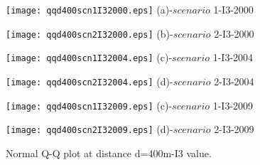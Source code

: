 \begin{figure}
     \begin{minipage}[h]{0.5\linewidth}
        \centering
        \texttt{[image: qqd400scn1I32000.eps]}
				\footnotesize{(a)-$scenario$ 1-I3-2000}
     \end{minipage}
\vspace{5.00mm}
    \begin{minipage}[h]{0.5\linewidth}
       \centering
       \texttt{[image: qqd400scn2I32000.eps]}
			\footnotesize{(b)-$scenario$ 2-I3-2000}
     \end{minipage}
\vspace{5.00mm}
    \begin{minipage}[h]{0.5\linewidth}
       \centering
       \texttt{[image: qqd400scn1I32004.eps]}
			\footnotesize{(c)-$scenario$ 1-I3-2004}
     \end{minipage}
\vspace{3.00mm}
    \begin{minipage}[h]{0.5\linewidth}
       \centering
       \texttt{[image: qqd400scn2I32004.eps]}
			\footnotesize{(d)-$scenario$ 2-I3-2004}
     \end{minipage}
	\vspace{3.00mm}
    \begin{minipage}[h]{0.5\linewidth}
       \centering
       \texttt{[image: qqd400scn1I32009.eps]}
			\footnotesize{(c)-$scenario$ 1-I3-2009}
     \end{minipage}
\vspace{3.00mm}
    \begin{minipage}[h]{0.5\linewidth}
       \centering
       \texttt{[image: qqd400scn2I32009.eps]}
			\footnotesize{(d)-$scenario$ 2-I3-2009}
     \end{minipage}
		\caption{Normal Q-Q plot at distance d=400m-I3 value.}
\label{fig15}
\end{figure}
